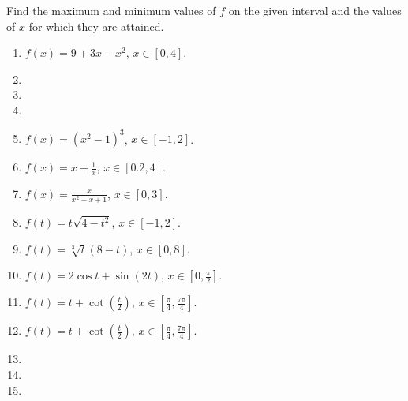 Find the maximum and minimum values of $f$ on the given interval and the values of $x$ for which they are attained.
\begin{multicols}{2}
\begin{enumerate}[ref={\fcProblemRef}]
\item $\displaystyle f(x)=9+3x-x^2$, $x\in [0,4]$.

\item 
\item 
\item 
\item $\displaystyle f(x)=(x^2-1)^3$, $x\in [-1, 2]$.

\item $\displaystyle f(x)=x+\frac{1}{x}$, $x\in [0.2,4 ]$.

\item $\displaystyle f(x)=\frac{x}{x^2-x+1}$, $x\in [0,3 ]$.

\item $\displaystyle f(t)=t\sqrt{4-t^2}$, $x\in [-1,2 ]$.

\item $\displaystyle f(t)=\sqrt[3]{t}(8-t) $, $x\in [0,8 ]$.

\item $\displaystyle f(t)=2\cos t+\sin (2t)$, $x\in [0,\frac{\pi}{2} ]$.

\item $\displaystyle f(t)=t+\cot \left(\frac{t}{2}\right) $, $x\in [\frac{\pi}{4},\frac{7\pi}{4} ]$.


\item $\displaystyle f(t)=t+\cot \left(\frac{t}{2}\right) $, $x\in [\frac{\pi}{4},\frac{7\pi}{4} ]$.
\item 
\item 
\item 
\end{enumerate}
\end{multicols}
